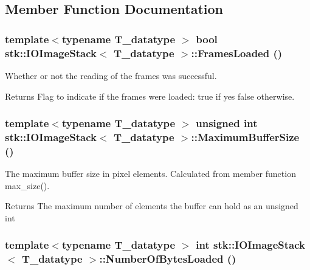 \subsection{Member Function Documentation}
\hypertarget{classstk_1_1IOImageStack_a2f6573c51109b983731eb78c5190ed6d}{
\subsubsection[{FramesLoaded}]{\setlength{\rightskip}{0pt plus 5cm}template$<$typename T\_\-datatype $>$ bool {\bf stk::IOImageStack}$<$ T\_\-datatype $>$::FramesLoaded ()}}
\label{classstk_1_1IOImageStack_a2f6573c51109b983731eb78c5190ed6d}
Whether or not the reading of the frames was successful. \begin{DoxyReturn}{Returns}
Flag to indicate if the frames were loaded: true if yes false otherwise. 
\end{DoxyReturn}
\hypertarget{classstk_1_1IOImageStack_a17b0b767f58fab89564a20e9be012bf3}{
\subsubsection[{MaximumBufferSize}]{\setlength{\rightskip}{0pt plus 5cm}template$<$typename T\_\-datatype $>$ unsigned int {\bf stk::IOImageStack}$<$ T\_\-datatype $>$::MaximumBufferSize ()}}
\label{classstk_1_1IOImageStack_a17b0b767f58fab89564a20e9be012bf3}
The maximum buffer size in pixel elements. Calculated from member function max\_\-size(). \begin{DoxyReturn}{Returns}
The maximum number of elements the buffer can hold as an unsigned int 
\end{DoxyReturn}
\hypertarget{classstk_1_1IOImageStack_a25fbe1abf7b60046745581d1e657bb42}{
\subsubsection[{NumberOfBytesLoaded}]{\setlength{\rightskip}{0pt plus 5cm}template$<$typename T\_\-datatype $>$ int {\bf stk::IOImageStack}$<$ T\_\-datatype $>$::NumberOfBytesLoaded ()}}
